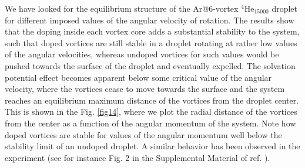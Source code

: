 We have looked for the equilibrium structure of the Ar@6-vortex $^4$He$_{15000}$ droplet
for different imposed values of the angular velocity
of rotation. The results show that the doping inside each vortex core
adds a substantial stability to the system, such that doped vortices are still 
stable in a droplet rotating at rather low 
values of the angular velocities, whereas undoped vortices
for such values would be pushed towards the surface of the
droplet and eventually expelled.
The solvation potential effect becomes
apparent below some critical 
value of the angular velocity, where the vortices
cease to move towards the surface and the 
system reaches an equilibrium maximum distance
of the vortices from the droplet center.
This is shown in the  Fig. \ref{fig14}, 
where we plot the radial distance of the vortices
from the center as a function of the angular momentum
of the system.
Note how doped vortices are stable for values
of the angular momentum well below the stability 
limit of an undoped droplet.
A similar behavior has been observed in the experiment (see for instance Fig. 2 in the
Supplemental Material of ref. \cite{Jon16}).


